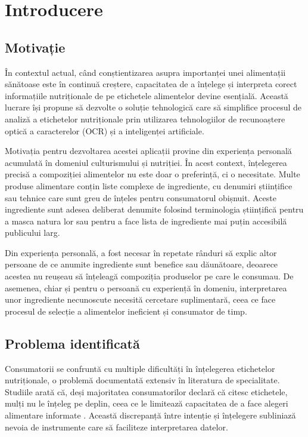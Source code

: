 \chapter{Introducere}

\section{Motivație}

În contextul actual, când conștientizarea asupra importanței unei alimentații sănătoase este în continuă creștere, capacitatea de a înțelege și interpreta corect informațiile nutriționale de pe etichetele alimentelor devine esențială. Această lucrare își propune să dezvolte o soluție tehnologică care să simplifice procesul de analiză a etichetelor nutriționale prin utilizarea tehnologiilor de recunoaștere optică a caracterelor (OCR) și a inteligenței artificiale.

Motivația pentru dezvoltarea acestei aplicații provine din experiența personală acumulată în domeniul culturismului și nutriției. În acest context, înțelegerea precisă a compoziției alimentelor nu este doar o preferință, ci o necesitate. Multe produse alimentare conțin liste complexe de ingrediente, cu denumiri științifice sau tehnice care sunt greu de înțeles pentru consumatorul obișnuit. Aceste ingrediente sunt adesea deliberat denumite folosind terminologia științifică pentru a masca natura lor sau pentru a face lista de ingrediente mai puțin accesibilă publicului larg.

Din experiența personală, a fost necesar în repetate rânduri să explic altor persoane de ce anumite ingrediente sunt benefice sau dăunătoare, deoarece acestea nu reușeau să înțeleagă compoziția produselor pe care le consumau. De asemenea, chiar și pentru o persoană cu experiență în domeniu, interpretarea unor ingrediente necunoscute necesită cercetare suplimentară, ceea ce face procesul de selecție a alimentelor ineficient și consumator de timp.

\section{Problema identificată}

Consumatorii se confruntă cu multiple dificultăți în înțelegerea etichetelor nutriționale, o problemă documentată extensiv în literatura de specialitate. Studiile arată că, deși majoritatea consumatorilor declară că citesc etichetele, mulți nu le înțeleg pe deplin, ceea ce le limitează capacitatea de a face alegeri alimentare informate \cite{Campos2011, Grunert2010}. Această discrepanță între intenție și înțelegere subliniază nevoia de instrumente care să faciliteze interpretarea datelor.

